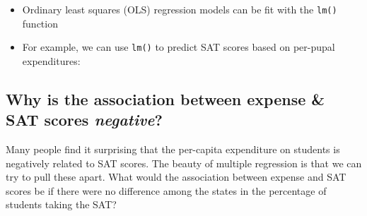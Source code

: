 \documentclass[]{book}
\newenvironment{Shaded}{\begin{snugshade}}{\end{snugshade}}
\newcommand{\AlertTok}[1]{\textcolor[rgb]{0.94,0.16,0.16}{#1}}
\newcommand{\CommentTok}[1]{\textcolor[rgb]{0.56,0.35,0.01}{\textit{#1}}}
\newcommand{\DataTypeTok}[1]{\textcolor[rgb]{0.13,0.29,0.53}{#1}}
\newcommand{\DecValTok}[1]{\textcolor[rgb]{0.00,0.00,0.81}{#1}}
\newcommand{\KeywordTok}[1]{\textcolor[rgb]{0.13,0.29,0.53}{\textbf{#1}}}
\newcommand{\NormalTok}[1]{#1}
\newcommand{\OperatorTok}[1]{\textcolor[rgb]{0.81,0.36,0.00}{\textbf{#1}}}
\newcommand{\StringTok}[1]{\textcolor[rgb]{0.31,0.60,0.02}{#1}}
\providecommand{\tightlist}{%
  \setlength{\itemsep}{0pt}\setlength{\parskip}{0pt}}
\begin{document}
\begin{itemize}
\tightlist
\item
  Ordinary least squares (OLS) regression models can be fit with the \texttt{lm()} function
\item
  For example, we can use \texttt{lm()} to predict SAT scores based on per-pupal expenditures:
\end{itemize}

\begin{Shaded}
\end{Shaded}

\hypertarget{why-is-the-association-between-expense-sat-scores-negative}{%
\subsection{\texorpdfstring{Why is the association between expense \& SAT scores \emph{negative}?}{Why is the association between expense \& SAT scores negative?}}\label{why-is-the-association-between-expense-sat-scores-negative}}

Many people find it surprising that the per-capita expenditure on students is negatively related to SAT scores. The beauty of multiple regression is that we can try to pull these apart. What would the association between expense and SAT scores be if there were no difference among the states in the percentage of students taking the SAT?

\begin{Shaded}
\end{Shaded}
\end{document}
